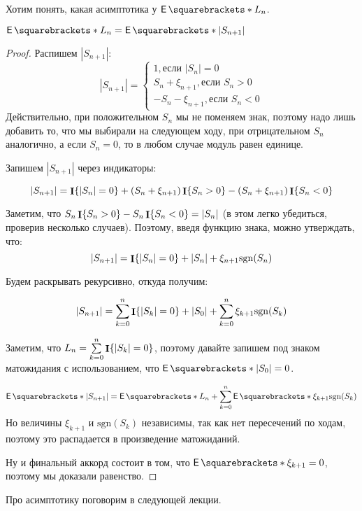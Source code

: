 Хотим понять, какая асимптотика у $\E{L_n}$.

\begin{lemma}
  $\E{L_n} = \E{|S_{n + 1}|}$
\end{lemma}

\begin{proof}
  Распишем $|S_{n+1}|$:
  \[
  |S_{n + 1}| =
  \begin{cases}
    1, \text{если $|S_n| = 0$}\\
    S_n + \xi_{n + 1}, \text{если $S_n > 0$}\\
    -S_n - \xi_{n + 1}, \text{если $S_n < 0$}
  \end{cases}
  \]
  Действительно, при положительном $S_n$ мы не поменяем знак, поэтому
  надо лишь добавить то, что мы выбирали на следующем ходу, при отрицательном
  $S_n$ аналогично, а если $S_n = 0$, то в любом случае модуль равен единице.

  Запишем $|S_{n + 1}|$ через индикаторы:

  \[
    |S_{n + 1}| = \mathop{\mathbf{I}}\{|S_n| = 0\} + (S_n + \xi_{n + 1})\mathop{\mathbf{I}}\{S_n > 0\} -(S_n + \xi_{n + 1})\mathop{\mathbf{I}}\{S_n < 0\}
  \]

  Заметим, что $S_n \mathop{\mathbf{I}}\{S_n > 0\} - S_n \mathop{\mathbf{I}}\{S_n < 0\} = |S_n|$ (в этом легко
  убедиться, проверив несколько случаев). Поэтому, введя функцию знака, можно
  утверждать, что:
  \[
   |S_{n + 1}| = \mathop{\mathbf{I}}\{|S_n| = 0\} + |S_n| + \xi_{n + 1}\mathrm{sgn}(S_n)
  \]

  Будем раскрывать рекурсивно, откуда получим:

  \[
    |S_{n + 1}| = \sum\limits_{k = 0}^{n} \mathop{\mathbf{I}}\{|S_k| = 0\} + |S_0| +
    \sum\limits_{k = 0}^{n} \xi_{k + 1}\mathrm{sgn}(S_{k})
  \]

  Заметим, что $L_n = \sum\limits_{k = 0}^{n} \mathop{\mathbf{I}}\{|S_k| = 0\}$, поэтому давайте
  запишем под знаком матожидания с использованием, что $\E{|S_0|} = 0$.

  \[
    \E{|S_{n + 1}|} = \E{L_n} + \sum\limits_{k = 0}^{n} \E{\xi_{k + 1}\mathrm{sgn}(S_{k})}
  \]
  Но величины $\xi_{k + 1}$ и $\mathrm{sgn}(S_{k})$ независимы, так как нет
  пересечений по ходам, поэтому это распадается в произведение матожиданий.

  Ну и финальный аккорд состоит в том, что $\E{\xi_{k + 1}} = 0$, поэтому
  мы доказали равенство.
\end{proof}

Про асимптотику поговорим в следующей лекции.

